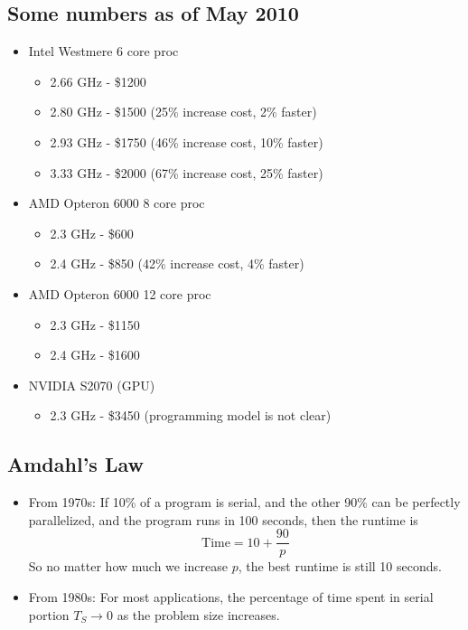 \documentclass[10pt]{article}
\newenvironment{mitemize}
{
  \begin{itemize}
  \setlength{\itemsep}{1pt}
  \setlength{\parskip}{0pt}
  \setlength{\parsep}{0pt}}{\end{itemize}
}
\begin{document}
\subsection{Some numbers as of May 2010}
\begin{mitemize}
  \item Intel Westmere 6 core proc
  \begin{mitemize}
    \item 2.66 GHz - \$1200
    \item 2.80 GHz - \$1500 (25\% increase cost, 2\% faster)
    \item 2.93 GHz - \$1750 (46\% increase cost, 10\% faster)
    \item 3.33 GHz - \$2000 (67\% increase cost, 25\% faster)
  \end{mitemize}
  \item AMD Opteron 6000 8 core proc
  \begin{mitemize}
    \item 2.3 GHz - \$600
    \item 2.4 GHz - \$850 (42\% increase cost, 4\% faster)
  \end{mitemize}
  \item AMD Opteron 6000 12 core proc
  \begin{mitemize}
    \item 2.3 GHz - \$1150
    \item 2.4 GHz - \$1600
  \end{mitemize}
  \item NVIDIA S2070 (GPU)
  \begin{mitemize}
    \item 2.3 GHz - \$3450 (programming model is not clear)
  \end{mitemize}
\end{mitemize}

\subsection{Amdahl's Law}
\begin{mitemize}
  \item From 1970s: If 10\% of a program is serial, and the other 90\% can be perfectly parallelized, and the program runs in 100 seconds, then the runtime is \[ \text{Time} = 10 + \frac{90}{p} \] So no matter how much we increase $p$, the best runtime is still 10 seconds.
  \item From 1980s: For most applications, the percentage of time spent in serial portion $T_S \rightarrow 0$ as the problem size increases. 
\end{mitemize}
\end{document}
